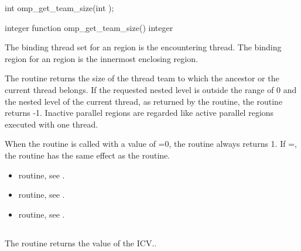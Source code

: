 \format
\begin{ccppspecific}
\begin{ompcFunction}
int omp_get_team_size(int );
\end{ompcFunction}
\end{ccppspecific}

\begin{fortranspecific}
\begin{ompfFunction}
integer function omp_get_team_size()
integer 
\end{ompfFunction}
\end{fortranspecific}

\binding
The binding thread set for an  region is the encountering
thread. The binding region for an  region is the innermost
enclosing  region.

\effect
The  routine returns the size of the thread team to which the
ancestor or the current thread belongs. If the requested nested level is outside the range
of 0 and the nested level of the current thread, as returned by the 
routine, the routine returns -1. Inactive parallel regions are regarded like active parallel
regions executed with one thread.

\begin{note}
When the  routine is called with a value of =0,
the routine always returns 1. If =, the routine has the same
effect as the\linebreak {} routine.
\end{note}

\crossreferences
\begin{itemize}
\item {} routine, see
.

\item {} routine, see
.

\item {} routine, see
.
\end{itemize}









\subsection{}
\label{subsec:omp_get_active_level}
\summary
The  routine returns the value of the  ICV..

